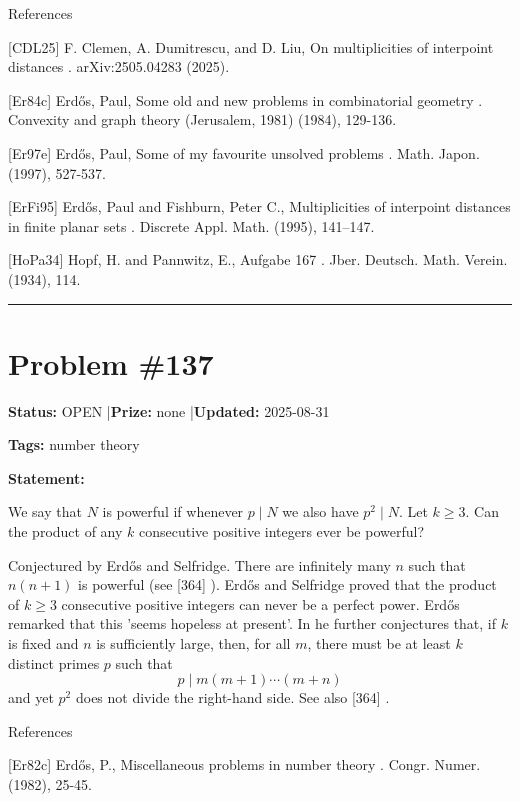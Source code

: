 \documentclass{article}
\begin{document}
References

[CDL25] F. Clemen, A. Dumitrescu, and D. Liu, On multiplicities of interpoint distances . arXiv:2505.04283 (2025).

[Er84c] Erd\H{o}s, Paul, Some old and new problems in combinatorial geometry . Convexity and graph theory (Jerusalem, 1981) (1984), 129-136.

[Er97e] Erd\H{o}s, Paul, Some of my favourite unsolved problems . Math. Japon. (1997), 527-537.

[ErFi95] Erd\H{o}s, Paul and Fishburn, Peter C., Multiplicities of interpoint distances in finite planar sets . Discrete Appl. Math. (1995), 141--147.

[HoPa34] Hopf, H. and Pannwitz, E., Aufgabe 167 . Jber. Deutsch. Math. Verein. (1934), 114.

\noindent\rule{\linewidth}{0.4pt}


\section{Problem \#137}
\label{prob:137}

\noindent\textbf{Status:} OPEN \quad|\quad \textbf{Prize:} none \quad|\quad \textbf{Updated:} 2025-08-31

\noindent\textbf{Tags:} number theory

\medskip

\noindent\textbf{Statement:}

We say that $N$ is powerful if whenever $p\mid N$ we also have $p^2\mid N$. Let $k\geq 3$. Can the product of any $k$ consecutive positive integers ever be powerful?




Conjectured by Erd\H{o}s and Selfridge. There are infinitely many $n$ such that $n(n+1)$ is powerful (see [364] ). Erd\H{o}s and Selfridge \cite{ErSe75} proved that the product of $k\geq 3$ consecutive positive integers can never be a perfect power. Erd\H{o}s remarked that this 'seems hopeless at present'. In \cite{Er82c} he further conjectures that, if $k$ is fixed and $n$ is sufficiently large, then, for all $m$, there must be at least $k$ distinct primes $p$ such that\[p\mid m(m+1)\cdots (m+n)\]and yet $p^2$ does not divide the right-hand side. See also [364] .




References

[Er82c] Erd\H{o}s, P., Miscellaneous problems in number theory . Congr. Numer. (1982), 25-45.
\end{document}
